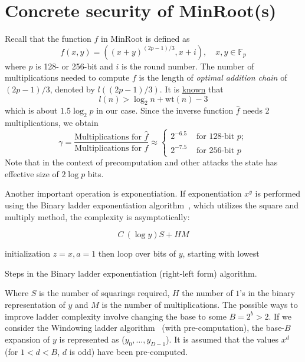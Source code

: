 \documentclass{article}
\begin{document}
 
\section{ Concrete security of MinRoot(s)}

Recall that the  function $f$ in MinRoot is defined as 
$$
f(x,y)
 = ((x+y)^{(2p-1)/3},x+i),\quad x,y\in \mathbb{F}_p
 $$
 where $p$ is 128- or 256-bit and $i$ is the round number. The number of multiplications needed to compute $f$ is the length of \emph{optimal addition chain} of $(2p-1)/3$, denoted by $l((2p-1)/3)$. It is \href{https://www.sciencedirect.com/science/article/pii/0304397575900080}{known} that
 $$
 l(n) > \log_2 n +\mathrm{wt}(n)-3
 $$ which is about $1.5\log_2 p$ in our case. Since the inverse function $\widehat{f}$ needs 2 multiplications, we obtain $$
 \gamma = \frac{\text{Multiplications for }\widehat{f}}{\text{Multiplications for }{f}}\approx
\begin{cases} 2^{-6.5} & \text{ for 128-bit } p;\\ 2^{-7.5}& \text{ for 256-bit }p
\end{cases}
$$
Note that in the context of precomputation and other attacks the state has effective size of $2\log p$ bits.

Another important operation is exponentiation. If exponentiation $x^y$ is performed using the Binary ladder exponentiation algorithm~\cite{Crandall_Pomerance_2005}, which utilizes the square and multiply method, the complexity is asymptotically:

$$ C ~ (\log y)S + HM $$

\begin{algorithm}[H]
 initialization $z=x, a=1$\;
 then loop over bits of $y$, starting with lowest\;
 \caption{Steps in the Binary ladder exponentiation (right-left form) algorithm.}
\end{algorithm}

Where $S$ is the number of squarings required, $H$ the number of $1$'s in the binary representation of $y$ and $M$ is the number of multiplications. The possible ways to improve ladder complexity involve changing the base to some $B = 2^b >2$. If we consider the Windowing ladder algorithm~\cite{Crandall_Pomerance_2005} (with pre-computation), the base-$B$ expansion of $y$ is represented as ($y_0, \dots, y_{D-1}$). It is assumed that the values $x^d$ (for $1 < d < B$, $d$ is odd) have been pre-computed. 
\end{document}
